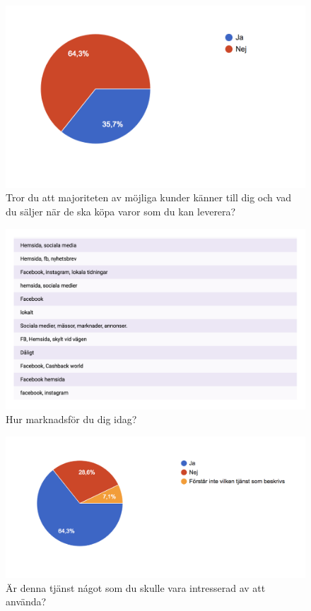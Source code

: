 \documentclass[10pt,a4paper,oneside]{article}
\begin{document}
\begin{figure}
	\includegraphics[scale=0.6]{7.png}
	\caption{Tror du att majoriteten av m\"ojliga kunder k\"anner till dig och vad du s\"aljer när de ska k\"opa varor som du kan leverera?}
\end{figure}

\begin{figure}
	\includegraphics[scale=0.6]{8.png}
	\caption{Hur marknadsf\"or du dig idag?}
\end{figure}

\begin{figure}
	\includegraphics[scale=0.6]{9.png}
	\caption{Är denna tj\"anst n\'agot som du skulle vara intresserad av att anv\"anda?}
\end{figure}
\end{document}
